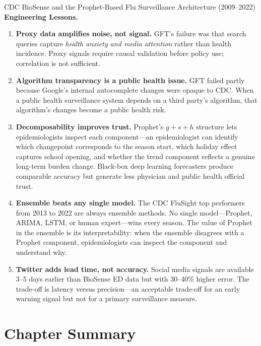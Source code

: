 \begin{casestudy}{CDC BioSense and the Prophet-Based Flu Surveillance
  Architecture (2009--2022)}
\textbf{Engineering Lessons.}
\begin{enumerate}
  \item \textbf{Proxy data amplifies noise, not signal.} GFT's failure was
        that search queries capture \emph{health anxiety and media attention}
        rather than health incidence. Proxy signals require causal validation
        before policy use; correlation is not sufficient.
  \item \textbf{Algorithm transparency is a public health issue.}
        GFT failed partly because Google's internal autocomplete changes
        were opaque to CDC. When a public health surveillance system
        depends on a third party's algorithm, that algorithm's changes
        become a public health risk.
  \item \textbf{Decomposability improves trust.} Prophet's $g + s + h$
        structure lets epidemiologists inspect each component---an
        epidemiologist can identify which changepoint corresponds to the
        season start, which holiday effect captures school opening, and
        whether the trend component reflects a genuine long-term burden
        change. Black-box deep learning forecasters produce comparable
        accuracy but generate less physician and public health official trust.
  \item \textbf{Ensemble beats any single model.} The CDC FluSight top
        performers from 2013 to 2022 are always ensemble methods.
        No single model---Prophet, ARIMA, LSTM, or human expert---wins
        every season. The value of Prophet in the ensemble is its
        interpretability: when the ensemble disagrees with a Prophet
        component, epidemiologists can inspect the component and understand
        why.
  \item \textbf{Twitter adds lead time, not accuracy.} Social media signals
        are available 3--5 days earlier than BioSense ED data but
        with 30--40\% higher error. The trade-off is latency versus
        precision---an acceptable trade-off for an early warning signal
        but not for a primary surveillance measure.
\end{enumerate}
\end{casestudy}

\section*{Chapter Summary}
\label{sec:ch10-summary}

